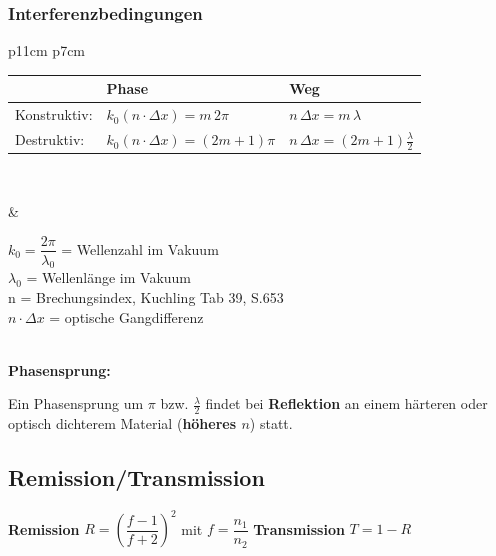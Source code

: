 \subsubsection{Interferenzbedingungen}
\begin{tabular}{p{11cm} p{7cm}}
\begin{minipage}[]{11cm}
	\begin{tabular}{|l|l|l|}
	\hline
	& \textbf{Phase} & \textbf{Weg} \\
	\hline
	Konstruktiv: 
		& $k_0(n\cdot \Delta x)=m \, 2\pi$
		& $n \, \Delta x = m \, \lambda$ \\
	Destruktiv: 
	 	& $k_0(n\cdot \Delta x)=(2m+1)\pi$
	 	& $n \, \Delta x = (2m+1) \frac{\lambda}{2}$ \\
	\hline
	\end{tabular}\\
	\end{minipage}
	& \parbox{8cm}{$k_0 = \dfrac{2\pi}{\lambda_0}$ = Wellenzahl im Vakuum\\
	$ \lambda_0$ = Wellenlänge im Vakuum\\
	n = Brechungsindex, Kuchling Tab 39, S.653\\
	$n\cdot \Delta x$ = optische Gangdifferenz}
\end{tabular}\\
\textbf{Phasensprung:}
		\parbox{16cm}{Ein Phasensprung um $\pi$ bzw. $\frac{\lambda}{2}$ findet bei
		\textbf{Reflektion} an einem härteren oder optisch dichterem Material
		(\textbf{höheres $n$}) statt.}
		
\subsection{Remission/Transmission}
\textbf{Remission} $R= \left(\dfrac{f-1}{f+2}\right)^2$ mit $ f = \dfrac{n_1}{n_2}$\hspace{2cm} \textbf{Transmission} $T = 1-R$  

